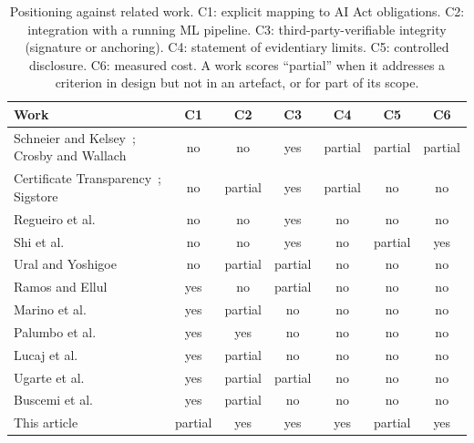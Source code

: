 \begin{table}[t]
\caption{Positioning against related work. C1: explicit mapping to AI Act obligations. C2: integration with a running ML pipeline. C3: third-party-verifiable integrity (signature or anchoring). C4: statement of evidentiary limits. C5: controlled disclosure. C6: measured cost. A work scores ``partial'' when it addresses a criterion in design but not in an artefact, or for part of its scope.}
\label{tab:positioning}
\footnotesize
\begin{tabularx}{\textwidth}{@{}Lcccccc@{}}
\toprule
Work & C1 & C2 & C3 & C4 & C5 & C6 \\
\midrule
Schneier and Kelsey~\cite{schneier1999}; Crosby and Wallach~\cite{crosby2009} & no & no & yes & partial & partial & partial \\
Certificate Transparency~\cite{rfc9162}; Sigstore~\cite{newman2022} & no & partial & yes & partial & no & no \\
Regueiro et al.~\cite{regueiro2021} & no & no & yes & no & no & no \\
Shi et al.~\cite{shi2022} & no & no & yes & no & partial & yes \\
Ural and Yoshigoe~\cite{ural2023} & no & partial & partial & no & no & no \\
Ramos and Ellul~\cite{ramos2024} & yes & no & partial & no & no & no \\
Marino et al.~\cite{marino2024} & yes & partial & no & no & no & no \\
Palumbo et al.~\cite{palumbo2025} & yes & yes & no & no & no & no \\
Lucaj et al.~\cite{lucaj2025} & yes & partial & no & no & no & no \\
Ugarte et al.~\cite{ugarte2026} & yes & partial & partial & no & no & no \\
Buscemi et al.~\cite{buscemi2026} & yes & partial & no & no & no & no \\
This article & partial & yes & yes & yes & partial & yes \\
\bottomrule
\end{tabularx}
\end{table}
